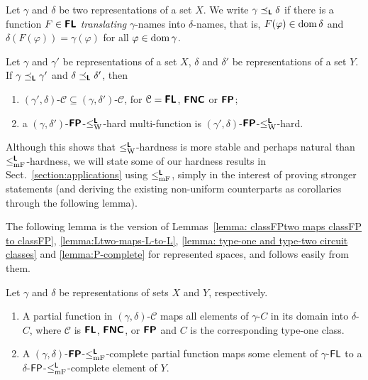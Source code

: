 \documentclass[a4paper,UKenglish]{lipics}
\begin{document}
\begin{definition}
Let $\gamma$ and $\delta$ be two representations of a set $X$.
We write $\gamma \preceq_{\text{\bfseries \sffamily \upshape L}} \delta$ if
there is a function $F \in \text{\bfseries \sffamily \upshape FL}$ \emph{translating} $\gamma$-names
into $\delta$-names, that is, 
$F (\varphi) \in \mathop{\rm dom} \delta$ and $\delta(F(\varphi)) = \gamma (\varphi)$ 
for all $\varphi \in \mathop{\rm dom} \gamma$.
\end{definition}

\begin{lemma}
 Let $\gamma$ and $\gamma'$ be representations of a set $X$, 
 $\delta$ and $\delta'$ be representations of a set $Y$.
 If $\gamma \preceq_{\text{\bfseries \sffamily \upshape L}} \gamma'$ and $\delta \preceq_{\text{\bfseries \sffamily \upshape L}} \delta'$, then 
\begin{enumerate}
\item 
$(\gamma', \delta)$-$\mathcal C \subseteq (\gamma, \delta')$-$\mathcal C$, 
for $\mathcal{C} = \text{\bfseries \sffamily \upshape FL}$, $\text{\bfseries \sffamily \upshape FNC}$ or $\text{\bfseries \sffamily \upshape FP}$; 
\item 
a $(\gamma, \delta')$-$\text{\bfseries \sffamily \upshape FP}$-$\leq _{\mathrm W} ^{\text{\bfseries \sffamily \upshape L}}$-hard multi-function is
$(\gamma', \delta)$-$\text{\bfseries \sffamily \upshape FP}$-$\leq _{\mathrm W} ^{\text{\bfseries \sffamily \upshape L}}$-hard.
\end{enumerate}
\end{lemma}

Although this shows that $\leq _{\mathrm W} ^{\text{\bfseries \sffamily \upshape L}}$-hardness is 
more stable and perhaps natural 
than $\leq _{\mathrm{mF}} ^{\text{\bfseries \sffamily \upshape L}}$-hardness, 
we will state some of our hardness results in Sect.~\ref{section:applications}
using $\leq _{\mathrm{mF}} ^{\text{\bfseries \sffamily \upshape L}}$, 
simply in the interest of proving stronger statements
(and deriving the existing non-uniform counterparts as corollaries
through the following lemma). 

The following lemma is the version of 
Lemmas~\ref{lemma: classFPtwo maps classFP to classFP}, 
\ref{lemma:Ltwo-maps-L-to-L}, 
\ref{lemma: type-one and type-two circuit classes} and 
\ref{lemma:P-complete} for represented spaces, 
and follows easily from them. 

\begin{lemma}
\label{lemma:p-comp-maps-l-to-p-comp}
 Let $\gamma$ and $\delta$ be representations of sets $X$ and $Y$, respectively.
\begin{enumerate}
\item
 A partial function in $(\gamma, \delta)$-$\mathcal C$
 maps all elements of $\gamma$-$C$ in its domain into $\delta$-$C$, 
 where $\mathcal C$ is $\text{\bfseries \sffamily \upshape FL}$, $\text{\bfseries \sffamily \upshape FNC}$, or $\text{\bfseries \sffamily \upshape FP}$ 
 and $C$ is the corresponding type-one class. 
\item \label{enumi:p-comp-maps-l-to-p-comp}
 A $(\gamma, \delta)$-$\text{\bfseries \sffamily \upshape FP}$-$\leq _{\mathrm{mF}} ^{\text{\bfseries \sffamily \upshape L}}$-complete partial function 
 maps some element of $\gamma$-$\mathsf{FL}$ 
 to a $\delta$-$\mathsf{FP}$-$\leq _{\mathrm{mF}}^{\mathsf{L}}$-complete element of $Y$.
\end{enumerate}
\end{lemma}
\end{document}
